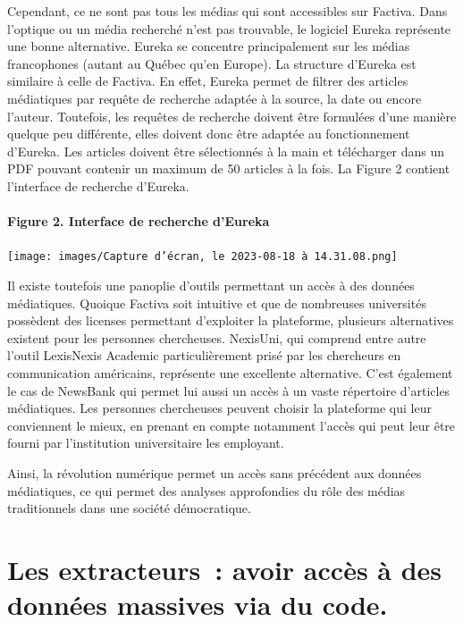 \documentclass[
  letterpaper,
]{scrbook}
\let\oldparagraph\paragraph
\renewcommand{\paragraph}[1]{\oldparagraph{#1}\mbox{}}
\begin{document}
Cependant, ce ne sont pas tous les médias qui sont accessibles sur
Factiva. Dans l'optique ou un média recherché n'est pas trouvable, le
logiciel Eureka représente une bonne alternative. Eureka se concentre
principalement sur les médias francophones (autant au Québec qu'en
Europe). La structure d'Eureka est similaire à celle de Factiva. En
effet, Eureka permet de filtrer des articles médiatiques par requête de
recherche adaptée à la source, la date ou encore l'auteur. Toutefois,
les requêtes de recherche doivent être formulées d'une manière quelque
peu différente, elles doivent donc être adaptée au fonctionnement
d'Eureka. Les articles doivent être sélectionnés à la main et
télécharger dans un PDF pouvant contenir un maximum de 50 articles à la
fois. La Figure 2 contient l'interface de recherche d'Eureka.

\hypertarget{figure-2.-interface-de-recherche-deureka}{%
\paragraph{Figure 2. Interface de recherche
d'Eureka}\label{figure-2.-interface-de-recherche-deureka}}

\texttt{[image: images/Capture d’écran, le 2023-08-18 à 14.31.08.png]}

Il existe toutefois une panoplie d'outils permettant un accès à des
données médiatiques. Quoique Factiva soit intuitive et que de nombreuses
universités possèdent des licenses permettant d'exploiter la plateforme,
plusieurs alternatives existent pour les personnes chercheuses.
NexisUni, qui comprend entre autre l'outil LexisNexis Academic
particulièrement prisé par les chercheurs en communication américains,
représente une excellente alternative. C'est également le cas de
NewsBank qui permet lui aussi un accès à un vaste répertoire d'articles
médiatiques. Les personnes chercheuses peuvent choisir la plateforme qui
leur conviennent le mieux, en prenant en compte notamment l'accès qui
peut leur être fourni par l'institution universitaire les employant.

Ainsi, la révolution numérique permet un accès sans précédent aux
données médiatiques, ce qui permet des analyses approfondies du rôle des
médias traditionnels dans une société démocratique.

\hypertarget{les-extracteurs-avoir-accuxe8s-uxe0-des-donnuxe9es-massives-via-du-code.}{%
\section{\texorpdfstring{\textbf{Les extracteurs~: avoir accès à des
données massives via du
code.}}{Les extracteurs~: avoir accès à des données massives via du code.}}\label{les-extracteurs-avoir-accuxe8s-uxe0-des-donnuxe9es-massives-via-du-code.}}
\end{document}

